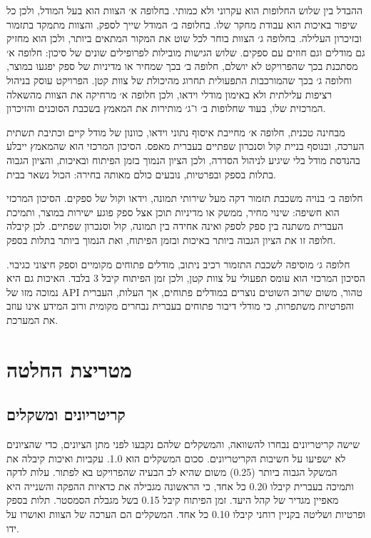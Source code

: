 ההבדל בין שלוש החלופות הוא עקרוני ולא כמותי. בחלופה א׳ הצוות הוא בעל המודל, ולכן כל שיפור באיכות הוא עבודת מחקר שלו. בחלופה ב׳ המודל שייך לספק, והצוות מתמקד בתזמור ובזיכרון העלילה. בחלופה ג׳ הצוות בוחר לכל שוט את המקור המתאים ביותר, ולכן הוא מחזיק גם מודלים וגם חוזים עם ספקים. שלוש הגישות מובילות לפרופילים שונים של סיכון: חלופה א׳ מסתכנת בכך שהפרויקט לא יושלם, חלופה ב׳ בכך שמחיר או מדיניות של ספק יפגעו במוצר, וחלופה ג׳ בכך שהמורכבות התפעולית תחרוג מהיכולת של צוות קטן. הפרויקט עוסק בניהול רציפות עלילתית ולא באימון מודלי וידאו, ולכן חלופה א׳ מרחיקה את הצוות מהשאלה המרכזית שלו, בעוד שחלופות ב׳ ו־ג׳ מותירות את המאמץ בשכבת הסוכנים והזיכרון.

מבחינה טכנית, חלופה א׳ מחייבת איסוף נתוני וידאו, כוונון של מודל קיים וכתיבת תשתית הערכה, ובנוסף בניית קול וסנכרון שפתיים בעברית מאפס. הסיכון המרכזי הוא שהמאמץ ייבלע בהנדסת מודל בלי שיגיע לניהול הסדרה, ולכן הציון הנמוך בזמן הפיתוח ובאיכות, והציון הגבוה בתלות בספק ובפרטיות, נובעים כולם מאותה בחירה: הכול נשאר בבית.

חלופה ב׳ בנויה משכבת תזמור דקה מעל שירותי תמונה, וידאו וקול של ספקים. הסיכון המרכזי הוא חשיפה: שינוי מחיר, ממשק או מדיניות תוכן אצל ספק פוגע ישירות במוצר, ותמיכת העברית משתנה בין ספק לספק ואינה אחידה בין תמונה, קול וסנכרון שפתיים. לכן קיבלה חלופה זו את הציון הגבוה ביותר באיכות ובזמן הפיתוח, ואת הנמוך ביותר בתלות בספק.

חלופה ג׳ מוסיפה לשכבת התזמור רכיב ניתוב, מודלים פתוחים מקומיים וספק חיצוני כגיבוי. הסיכון המרכזי הוא עומס תפעולי על צוות קטן, ולכן זמן הפיתוח קיבל \textenglish{3} בלבד. האיכות גם היא נמוכה מזו של \textenglish{API} טהור, משום שרוב השוטים נוצרים במודלים פתוחים, אך העלות, העברית והפרטיות משתפרות, כי מודלי דיבור פתוחים בעברית נבחרים מקומית ורוב המידע אינו עוזב את המערכת.

\section{מטריצת החלטה}
\subsection{קריטריונים ומשקלים}
שישה קריטריונים נבחרו להשוואה, והמשקלים שלהם נקבעו לפני מתן הציונים, כדי שהציונים לא ישפיעו על חשיבות הקריטריונים. סכום המשקלים הוא \textenglish{1.0}. עקביות ואיכות קיבלה את המשקל הגבוה ביותר (\textenglish{0.25}) משום שהיא לב הבעיה שהפרויקט בא לפתור. עלות לדקה ותמיכה בעברית קיבלו \textenglish{0.20} כל אחד, כי הראשונה מגבילה את כדאיות ההפקה והשנייה היא מאפיין מגדיר של קהל היעד. זמן הפיתוח קיבל \textenglish{0.15} בשל מגבלת הסמסטר. תלות בספק ופרטיות ושליטה בקניין רוחני קיבלו \textenglish{0.10} כל אחד. המשקלים הם הערכה של הצוות ואושרו על ידו.

